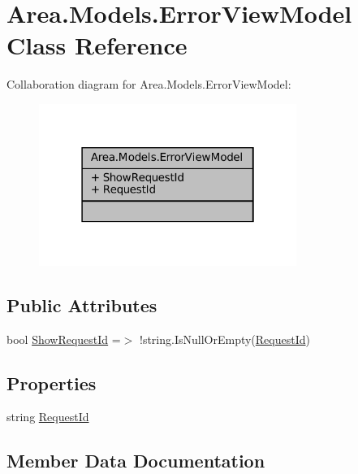 \hypertarget{classArea_1_1Models_1_1ErrorViewModel}{}\section{Area.\+Models.\+Error\+View\+Model Class Reference}
\label{classArea_1_1Models_1_1ErrorViewModel}


Collaboration diagram for Area.\+Models.\+Error\+View\+Model\+:
\nopagebreak
\begin{figure}[H]
\begin{center}
\leavevmode
\includegraphics[width=238pt]{classArea_1_1Models_1_1ErrorViewModel__coll__graph}
\end{center}
\end{figure}
\subsection*{Public Attributes}
\begin{DoxyCompactItemize}
\item 
bool \mbox{\hyperlink{classArea_1_1Models_1_1ErrorViewModel_ae6d9b53d73e3d33702f8630c6a524881}{Show\+Request\+Id}} =$>$ !string.\+Is\+Null\+Or\+Empty(\mbox{\hyperlink{classArea_1_1Models_1_1ErrorViewModel_aef67bef86ae4e1edfc14fb486dba1981}{Request\+Id}})
\end{DoxyCompactItemize}
\subsection*{Properties}
\begin{DoxyCompactItemize}
\item 
string \mbox{\hyperlink{classArea_1_1Models_1_1ErrorViewModel_aef67bef86ae4e1edfc14fb486dba1981}{Request\+Id}}
\end{DoxyCompactItemize}


\subsection{Member Data Documentation}
\mbox{\label{classArea_1_1Models_1_1ErrorViewModel_ae6d9b53d73e3d33702f8630c6a524881}} 
